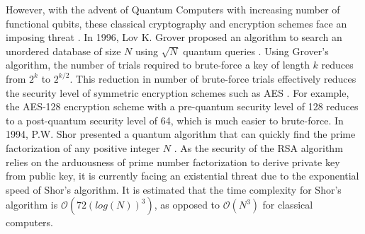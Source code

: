 \documentclass[a4paper]{cas-sc}
\begin{document}
However, with the advent of Quantum Computers with increasing number of functional qubits, these classical cryptography and encryption schemes face an imposing threat \cite{bernstein2017post}. In 1996, Lov K. Grover proposed an algorithm to search an unordered database of size $N$ using $\sqrt{N}$ quantum queries \cite{grover1996fast}. Using Grover's algorithm, the number of trials required to brute-force a key of length $k$ reduces from $2^{k}$ to $2^{k/2}$. This reduction in number of brute-force trials effectively reduces the security level of symmetric encryption schemes such as AES \cite{Daemen2002}. For example, the AES-128 encryption scheme with a pre-quantum security level of 128 reduces to a post-quantum security level of 64, which is much easier to brute-force. In 1994, P.W. Shor presented a quantum algorithm that can quickly find the prime factorization of any positive integer $N$ \cite{Shor1997}. As the security of the RSA algorithm relies on the arduousness of prime number factorization to derive private key from public key, it is currently facing an existential threat due to the exponential speed of Shor's algorithm. It is estimated that the time complexity for Shor's algorithm is $\mathcal{O}(72(log(N))^{3})$, as opposed to $\mathcal{O}(N^3)$ for classical computers.
\end{document}
